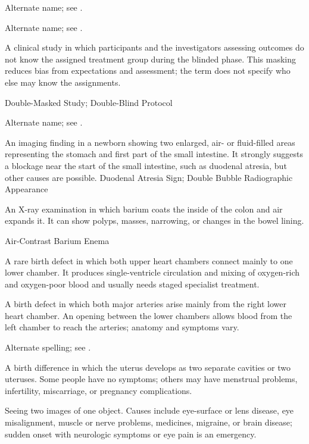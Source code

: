  Alternate name; see .

 Alternate name; see .

 A clinical study in which participants and the investigators assessing outcomes do not know the assigned treatment group during the blinded phase. This masking reduces bias from expectations and assessment; the term does not specify who else may know the assignments.

\synonyms
Double-Masked Study; Double-Blind Protocol

 Alternate name; see .

 An imaging finding in a newborn showing two enlarged, air- or fluid-filled areas representing the stomach and first part of the small intestine. It strongly suggests a blockage near the start of the small intestine, such as duodenal atresia, but other causes are possible.
\synonyms
Duodenal Atresia Sign; Double Bubble Radiographic Appearance

 An X-ray examination in which barium coats the inside of the colon and air expands it. It can show polyps, masses, narrowing, or changes in the bowel lining.

\synonyms
Air-Contrast Barium Enema

 A rare birth defect in which both upper heart chambers connect mainly to one lower chamber. It produces single-ventricle circulation and mixing of oxygen-rich and oxygen-poor blood and usually needs staged specialist treatment.

 A birth defect in which both major arteries arise mainly from the right lower heart chamber. An opening between the lower chambers allows blood from the left chamber to reach the arteries; anatomy and symptoms vary.

 Alternate spelling; see .

 A birth difference in which the uterus develops as two separate cavities or two uteruses. Some people have no symptoms; others may have menstrual problems, infertility, miscarriage, or pregnancy complications.

 Seeing two images of one object. Causes include eye-surface or lens disease, eye misalignment, muscle or nerve problems, medicines, migraine, or brain disease; sudden onset with neurologic symptoms or eye pain is an emergency.

